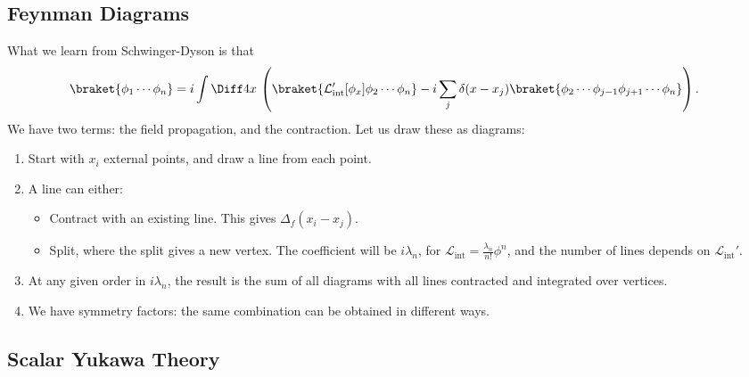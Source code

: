 \documentclass[12pt]{article}
\begin{document}
\subsection{Feynman Diagrams}%
\label{sub:fd}

What we learn from Schwinger-Dyson is that
\begin{align*}
	\braket{\phi_1 \cdots \phi_n} &= i \int \Diff 4 x \, \left( \braket{ \mathcal{L}_{\mathrm{int}}'[\phi_x] \phi_2 \cdots \phi_n} - i \sum_j \delta(x - x_j) \braket{\phi_2 \cdots \phi_{j-1} \phi_{j+1} \cdots \phi_n} \right).
\end{align*}
We have two terms: the field propagation, and the contraction. Let us draw these as diagrams:
\begin{enumerate}
	\item Start with $x_i$ external points, and draw a line from each point.
	\item A line can either:
		\begin{itemize}
			\item Contract with an existing line. This gives $\Delta_f(x_i - x_j)$.
			\item Split, where the split gives a new vertex. The coefficient will be $i \lambda_n$, for $\mathcal{L}_{\mathrm{int}} = \frac{\lambda_n}{n!} \phi^n$, and the number of lines depends on $\mathcal{L}_{\mathrm{int}}'$.
		\end{itemize}
	\item At any given order in $i \lambda_n$, the result is the sum of all diagrams with all lines contracted and integrated over vertices.
	\item We have symmetry factors: the same combination can be obtained in different ways.
\end{enumerate}



\subsection{Scalar Yukawa Theory}%
\label{sub:syt}
\end{document}
